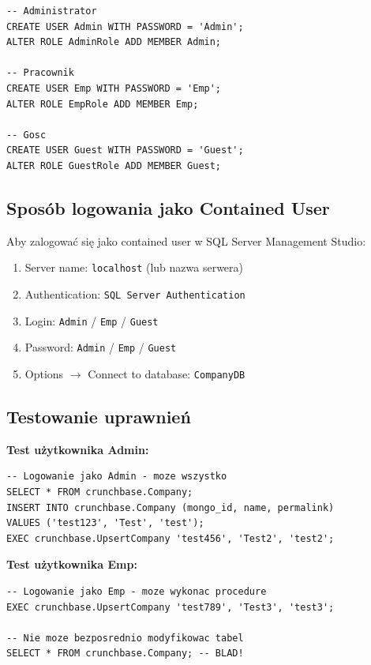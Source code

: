\documentclass[12pt,a4paper]{article}
\begin{document}
\begin{lstlisting}[caption={Tworzenie użytkowników contained}]
-- Administrator
CREATE USER Admin WITH PASSWORD = 'Admin';
ALTER ROLE AdminRole ADD MEMBER Admin;

-- Pracownik
CREATE USER Emp WITH PASSWORD = 'Emp';
ALTER ROLE EmpRole ADD MEMBER Emp;

-- Gosc
CREATE USER Guest WITH PASSWORD = 'Guest';
ALTER ROLE GuestRole ADD MEMBER Guest;
\end{lstlisting}

\subsection{Sposób logowania jako Contained User}

Aby zalogować się jako contained user w SQL Server Management Studio:

\begin{enumerate}
    \item Server name: \texttt{localhost} (lub nazwa serwera)
    \item Authentication: \texttt{SQL Server Authentication}
    \item Login: \texttt{Admin} / \texttt{Emp} / \texttt{Guest}
    \item Password: \texttt{Admin} / \texttt{Emp} / \texttt{Guest}
    \item Options $\rightarrow$ Connect to database: \texttt{CompanyDB}
\end{enumerate}

\subsection{Testowanie uprawnień}

\textbf{Test użytkownika Admin:}
\begin{lstlisting}
-- Logowanie jako Admin - moze wszystko
SELECT * FROM crunchbase.Company;
INSERT INTO crunchbase.Company (mongo_id, name, permalink)
VALUES ('test123', 'Test', 'test');
EXEC crunchbase.UpsertCompany 'test456', 'Test2', 'test2';
\end{lstlisting}

\textbf{Test użytkownika Emp:}
\begin{lstlisting}
-- Logowanie jako Emp - moze wykonac procedure
EXEC crunchbase.UpsertCompany 'test789', 'Test3', 'test3';

-- Nie moze bezposrednio modyfikowac tabel
SELECT * FROM crunchbase.Company; -- BLAD!
\end{lstlisting}
\end{document}
